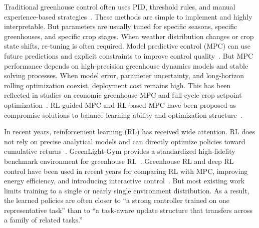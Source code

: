 \documentclass[number,preprint,review,12pt]{elsarticle}
\begin{document}
Traditional greenhouse control often uses PID, threshold rules, and manual experience-based strategies~\cite{berenguel1997temperature,vanstraten2010optimal}. These methods are simple to implement and highly interpretable. But parameters are usually tuned for specific seasons, specific greenhouses, and specific crop stages. When weather distribution changes or crop state shifts, re-tuning is often required. Model predictive control (MPC) can use future predictions and explicit constraints to improve control quality~\cite{camacho2013mpc}. But MPC performance depends on high-precision greenhouse dynamics models and stable solving processes. When model error, parameter uncertainty, and long-horizon rolling optimization coexist, deployment cost remains high. This has been reflected in studies on economic greenhouse MPC and full-cycle crop setpoint optimization~\cite{panagopoulos2025cascaded,garcia2023multi,van2025optimal}. RL-guided MPC and RL-based MPC have been proposed as compromise solutions to balance learning ability and optimization structure~\cite{msaad2025rl,mallick2025reinforcement}.

In recent years, reinforcement learning (RL) has received wide attention. RL does not rely on precise analytical models and can directly optimize policies toward cumulative returns~\cite{sutton2018reinforcement,brockman2016gym,mnih2015dqn,arulkumaran2017brief,lillicrap2015ddpg,haarnoja2018sac,duan2016benchmark}. GreenLight-Gym provides a standardized high-fidelity benchmark environment for greenhouse RL~\cite{van2025greenlight}. Greenhouse RL and deep RL control have been used in recent years for comparing RL with MPC, improving energy efficiency, and introducing interactive control~\cite{morcego2023reinforcement,ajagekar2023energy,xiao2026grower}. But most existing work limits training to a single or nearly single environment distribution. As a result, the learned policies are often closer to ``a strong controller trained on one representative task'' than to ``a task-aware update structure that transfers across a family of related tasks.''
\end{document}
